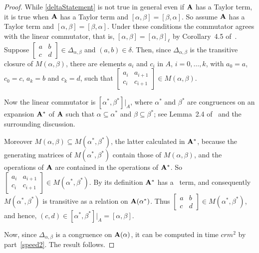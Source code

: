 \begin{proof}
While \eqref{deltaStatement} is not true in general even if
$\mathbf{A}$ has a Taylor term, it is true when
$\mathbf{A}$ has a Taylor term and $[\alpha,\beta] = [\beta,\alpha]$.
So assume $\mathbf{A}$ has a Taylor term and $[\alpha,\beta] = [\beta,\alpha]$.
Under these conditions the commutator agrees with the
linear commutator, that is, $[\alpha,\beta] = [\alpha,\beta]_\ell$ by
Corollary~4.5 of~\cite{MR1663558}.
Suppose
$
\begin{bmatrix}
a&b\\c&d
\end{bmatrix}\in \Delta_{\alpha,\beta}$ and $(a,b)\in \delta$.
Then, since
$\Delta_{\alpha,\beta}$ is the transitive closure of
$M(\alpha,\beta)$, there are
elements $a_i$ and $c_i$ in $A$,
$i = 0, \ldots, k$, with $a_0 =a$,  $c_0 = c$, $a_k = b$ and
$c_k = d$, such that
$
\begin{bmatrix}
a_i&a_{i+1}\\c_i&c_{i+1}
\end{bmatrix}\in M(\alpha,\beta)$.

Now the linear commutator is $[\alpha^*,\beta^*]\big\vert_{A}$,
where $\alpha^*$ and $\beta^*$ are congruences on an expansion
$\mathbf{A}^*$ of $\mathbf{A}$ such that $\alpha \subseteq \alpha^*$
and $\beta \subseteq \beta^*$; see Lemma~2.4 of~\cite{MR1663558}
and the surrounding discussion.

Moreover $M(\alpha,\beta) \subseteq M(\alpha^*,\beta^*)$, the latter
calculated in $\mathbf{A}^*$, because the generating matrices of
$M(\alpha^*,\beta^*)$ contain those of $M(\alpha,\beta)$, and
the operations of $\mathbf{A}$ are contained in the operations
of $\mathbf{A}^*$.  So
$
\begin{bmatrix}
a_i&a_{i+1}\\c_i&c_{i+1}
\end{bmatrix}\in M(\alpha^*,\beta^*)$.
By its definition $\mathbf{A}^*$ has a \malcev\ term, and
consequently $M(\alpha^*,\beta^*)$ is transitive as
a relation on $\mathbf{A}(\alpha^*)$. Thus
$
\begin{bmatrix}
a&b\\c&d
\end{bmatrix}\in M(\alpha^*,\beta^*)$, and hence,
$(c,d) \in [\alpha^*,\beta^*]\big\vert_A = [\alpha,\beta]$.

Now, since $\Delta_{\alpha,\beta}$ is a congruence on
$\mathbf{A}(\alpha)$, it can be computed in time
$crm^2$ by part~\eqref{speed2}. The result follows.
\end{proof}



